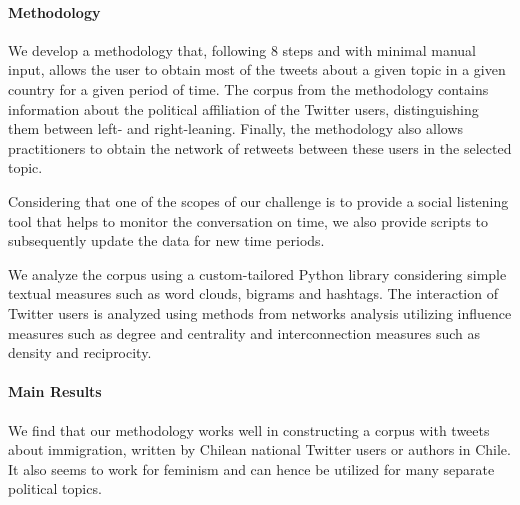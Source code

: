   
    
    
    
    \paragraph{Methodology}
    We develop a methodology that, following 8 steps and with minimal manual input, allows the user to obtain most of the tweets about a given topic in a given country for a given period of time. The corpus from the methodology contains information about the political affiliation of the Twitter users, distinguishing them between left- and right-leaning. Finally, the methodology also allows practitioners to obtain the network of retweets between these users in the selected topic.
    
    Considering that one of the scopes of our challenge is to provide a social listening tool that helps to monitor the conversation on time, we also provide scripts to subsequently update the data for new time periods. 
    
    We analyze the corpus using a custom-tailored Python library considering simple textual measures such as word clouds, bigrams and hashtags. The interaction of Twitter users is analyzed using methods from networks analysis utilizing influence measures such as degree and centrality and interconnection measures such as density and reciprocity.

        
    
    \paragraph{Main Results}
        We find that our methodology works well in constructing a corpus with tweets about immigration, written by Chilean national Twitter users or authors in Chile. It also seems to work for feminism and can hence be utilized for many separate political topics. 
        
